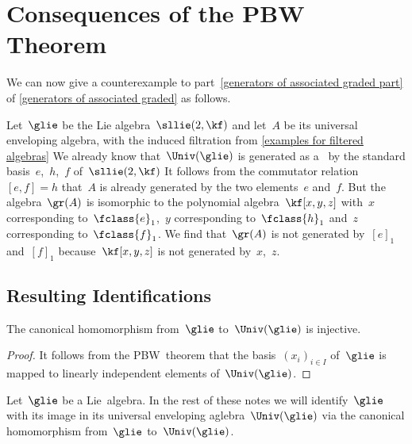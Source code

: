 \section{Consequences of the PBW Theorem}


\begin{example}
	\label{converse to warning about generating set for the associated graded}
	We can now give a counterexample to part~\ref{generators of associated graded part} of \cref{generators of associated graded} as follows.

	Let~$\glie$ be the Lie algebra~$\sllie(2, \kf)$ and let~$A$ be its universal enveloping algebra, with the induced filtration from \cref{examples for filtered algebras}
	We already know that~$\Univ(\glie)$ is generated as a~\algebra{$\kf$} by the standard basis~$e$,~$h$,~$f$ of~$\sllie(2, \kf)$
	It follows from the commutator relation~$[e,f] = h$ that~$A$ is already generated by the two elements~$e$ and~$f$.
	But the algebra~$\gr(A)$ is isomorphic to the polynomial algebra~$\kf[x, y, z]$ with~$x$ corresponding to~$\fclass{ e }_1$,~$y$ corresponding to~$\fclass{h}_1$ and~$z$ corresponding to~$\fclass{f}_1$.
	We find that~$\gr(A)$ is not generated by~$[e]_1$ and~$[f]_1$ because~$\kf[x,y,z]$ is not generated by~$x$,~$z$.
\end{example}


\subsection*{Resulting Identifications}

\begin{proposition}
	\label{embedding into uea}
	The canonical homomorphism from~$\glie$ to~$\Univ(\glie)$ is injective.
\end{proposition}


\begin{proof}
	It follows from the PBW~theorem that the basis~$(x_i)_{i \in I}$ of~$\glie$ is mapped to linearly independent elements of~$\Univ(\glie)$.
\end{proof}


\begin{convention}
	\label{identification of lie algebra with image in its uea}
	Let~$\glie$ be a Lie~algebra.
	In the rest of these notes we will identify~$\glie$ with its image in its universal enveloping aglebra~$\Univ(\glie)$ via the canonical homomorphism from~$\glie$ to~$\Univ(\glie)$. 
\end{convention}


